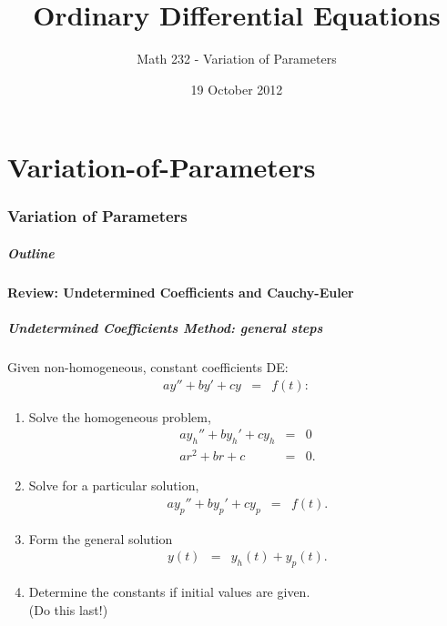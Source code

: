 \part{Variation-of-Parameters}
\section{Variation of Parameters}

\title{Ordinary Differential Equations}
\subtitle{Math 232 - Variation of Parameters}
\date{19 October 2012}

\begin{frame}
  \titlepage
\end{frame}

\begin{frame}
  \frametitle{Outline}
\end{frame}

\subsection{Review: Undetermined Coefficients and Cauchy-Euler}

\begin{frame}
  \frametitle{Undetermined Coefficients Method: general steps}

  Given non-homogeneous, constant coefficients DE:
  \begin{eqnarray*}
    a y'' + by' + cy & = & f(t):
  \end{eqnarray*}
  \vspace{-0.5cm}
  \begin{enumerate}
  \item Solve the homogeneous problem,
    {\color{blue}\begin{eqnarray*}
      a y_h'' + by_h' + cy_h & = & 0\\
      a r^2 + br + c & = & 0.
    \end{eqnarray*}}
  \vspace{-0.5cm}
  \item Solve for a particular solution,
    {\color{blue}\begin{eqnarray*}
      a y_p'' + by_p' + cy_p & = & f(t).
    \end{eqnarray*}}
  \item Form the general solution
   {\color{red} \begin{eqnarray*}
      y(t) & = & y_h(t) + y_p(t).
    \end{eqnarray*}}
  \item Determine the constants if initial values are given. \\
    (Do this last!)
  \end{enumerate}


\end{frame}

